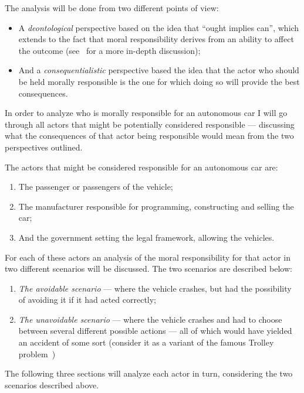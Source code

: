The analysis will be done from two different points of view:
\begin{itemize}
\item A \textit{deontological} perspective based on the idea that ``ought implies
  can'', which extends to the fact that moral responsibility derives from an
  ability to affect the outcome (see~\cite[Ch. 7]{stern_2015_kantian_kevaao}
  for a more in-depth discussion);
\item And a \textit{consequentialistic} perspective based the idea that the actor who
  should be held morally responsible is the one for which doing so will provide
  the best consequences.
\end{itemize}

In order to analyze who is morally responsible for an autonomous car I will
go through all actors that might be potentially considered responsible ---
discussing what the consequences of that actor being responsible would mean from
the two perspectives outlined.

The actors that might be considered responsible for an autonomous car are:
\begin{enumerate}
\item The passenger or passengers of the vehicle;
\item The manufacturer responsible for programming, constructing and selling the car;
\item And the government setting the legal framework, allowing the vehicles.
\end{enumerate}

For each of these actors an analysis of the moral responsibility for that actor
in two different scenarios will be discussed. The two scenarios are described below:
\begin{enumerate}
\item\label{item:scenario1} \textit{The avoidable scenario} --- where the
  vehicle crashes, but had the possibility of avoiding it if it had acted
  correctly;
\item\label{item:scenario2} \textit{The unavoidable scenario} --- where the
  vehicle crashes and had to choose between several different possible
  actions --- all of which would have yielded an accident of some sort (consider
  it as a variant of the famous Trolley problem~\cite{2016_trolley_tp})
\end{enumerate}

The following three sections will analyze each actor in turn, considering the
two scenarios described above.

